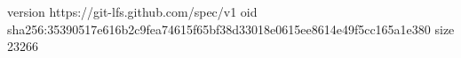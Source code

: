version https://git-lfs.github.com/spec/v1
oid sha256:35390517e616b2c9fea74615f65bf38d33018e0615ee8614e49f5cc165a1e380
size 23266
